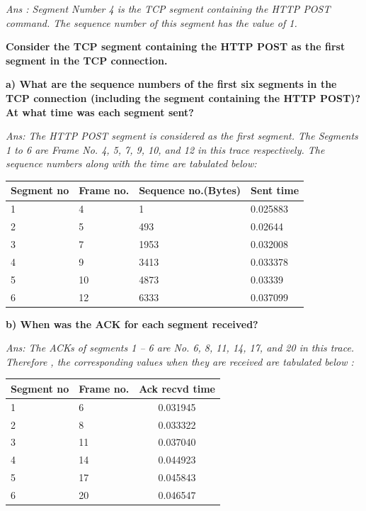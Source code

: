\documentclass[11pt]{article}
\numberwithin{equation}{section}
\begin{document}
\textsl{Ans : Segment Number 4 is the TCP segment containing the HTTP POST command. The sequence number of this segment has the value of 1.} \newline

\textbf{Consider the TCP segment containing the HTTP POST as the first segment in the TCP connection.} \newline

\textbf{ a) What are the sequence numbers of the first six segments in the TCP connection (including the segment containing the HTTP POST)? At what time was each segment sent? }

\textsl{Ans: The HTTP POST segment is considered as the first segment. The  Segments 1 to 6 are Frame No. 4, 5, 7, 9, 10, and 12 in this trace respectively. The sequence numbers along with the time are tabulated below: }

\begin{table}[H]
\begin{center}
    \begin{tabular}{|p{2cm}|p{2cm}|p{2 cm}|p{2 cm}|}
    \hline
     Segment no & Frame no. & Sequence no.(Bytes) & Sent time\\ \hline
    1 & 4 & 1 & 0.025883\\ \hline
    2 & 5 & 493 & 0.02644\\ \hline
    3 & 7 & 1953 & 0.032008\\ \hline
    4 & 9 & 3413 & 0.033378\\ \hline
    5 & 10 & 4873 & 0.03339 \\ \hline
    6 & 12 & 6333 & 0.037099\\ \hline
    \end{tabular}
\end{center}
\end{table}


\textbf{ b) When was the ACK for each segment received? }

\textsl{Ans: The ACKs of segments 1 – 6 are No. 6, 8, 11, 14, 17, and 20 in this trace. Therefore , the corresponding values when they are received are tabulated below : } 

\begin{table}[H]
\begin{center}
    \begin{tabular}{|p{2cm}|p{2cm}|c|}
    \hline
     Segment no & Frame no. & Ack recvd time \\ \hline
    1 & 6 & 0.031945 \\ \hline
    2 & 8 & 0.033322 \\ \hline
    3 & 11 & 0.037040 \\ \hline
    4 & 14 & 0.044923 \\ \hline
    5 & 17 & 0.045843 \\ \hline
    6 & 20 & 0.046547 \\ \hline
    \end{tabular}
\end{center}
\end{table}
\end{document}
